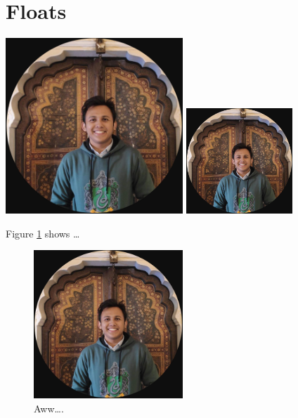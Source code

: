 \documentclass{article}
\begin{document}



\newpage
\section*{Floats}




\includegraphics[width=0.5\textwidth]{1}
\includegraphics[width=0.3\textwidth, angle=270]{1}

Figure \ref{fig:gerbil} shows \ldots

\begin{figure}
\centering
\includegraphics[width=0.5\textwidth]{1}
\caption{\label{fig:gerbil}Aww\ldots.}
\end{figure}
\end{document}
